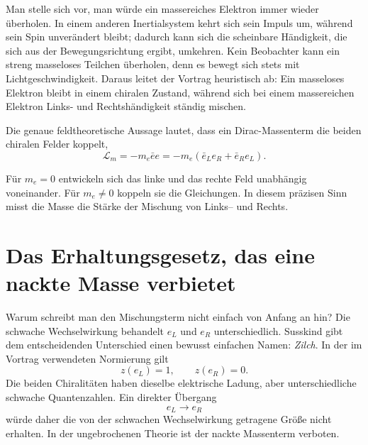 Man stelle sich vor, man würde ein massereiches Elektron immer wieder überholen. In einem anderen Inertialsystem kehrt sich sein Impuls um, während sein Spin unverändert bleibt; dadurch kann sich die scheinbare Händigkeit, die sich aus der Bewegungsrichtung ergibt, umkehren. Kein Beobachter kann ein streng masseloses Teilchen überholen, denn es bewegt sich stets mit Lichtgeschwindigkeit. Daraus leitet der Vortrag heuristisch ab: Ein masseloses Elektron bleibt in einem chiralen Zustand, während sich bei einem massereichen Elektron Links- und Rechtshändigkeit ständig mischen.

Die genaue feldtheoretische Aussage lautet, dass ein Dirac-Massenterm die beiden chiralen Felder koppelt,
\begin{equation}
\mathcal L_m
=
-m_e\bar e e
=
-m_e
\left(
  \bar e_L e_R
  +
  \bar e_R e_L
\right).
\end{equation}

Für $m_e=0$ entwickeln sich das linke und das rechte Feld unabhängig voneinander. Für $m_e\ne0$ koppeln sie die Gleichungen. In diesem präzisen Sinn misst die Masse die Stärke der Mischung von Links-- und Rechts.

\section{Das Erhaltungsgesetz, das eine nackte Masse verbietet}

Warum schreibt man den Mischungsterm nicht einfach von Anfang an hin? Die schwache Wechselwirkung behandelt $e_L$ und $e_R$ unterschiedlich. Susskind gibt dem entscheidenden Unterschied einen bewusst einfachen Namen: \emph{Zilch}. In der im Vortrag verwendeten Normierung gilt
\begin{equation}
z(e_L)=1,
\qquad
z(e_R)=0.
\end{equation}
Die beiden Chiralitäten haben dieselbe elektrische Ladung, aber unterschiedliche schwache Quantenzahlen. Ein direkter Übergang
\begin{equation}
e_L\longrightarrow e_R
\end{equation}
würde daher die von der schwachen Wechselwirkung getragene Größe nicht erhalten. In der ungebrochenen Theorie ist der nackte Massenterm verboten.

